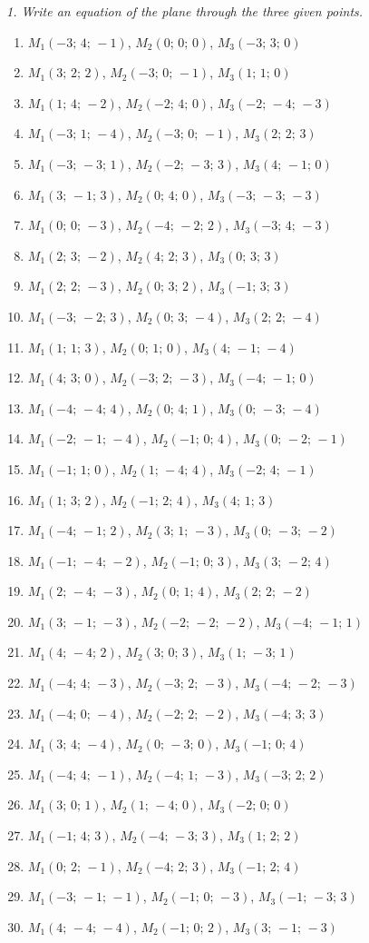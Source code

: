 \emph{1. Write an equation of the plane through the three given points.}
\bigskip
\begin{enumerate}[label=\arabic*., leftmargin=*]
\item $M_1(-3;\,4;\,-1)$, $M_2(0;\,0;\,0)$, $M_3(-3;\,3;\,0)$
\item $M_1(3;\,2;\,2)$, $M_2(-3;\,0;\,-1)$, $M_3(1;\,1;\,0)$
\item $M_1(1;\,4;\,-2)$, $M_2(-2;\,4;\,0)$, $M_3(-2;\,-4;\,-3)$
\item $M_1(-3;\,1;\,-4)$, $M_2(-3;\,0;\,-1)$, $M_3(2;\,2;\,3)$
\item $M_1(-3;\,-3;\,1)$, $M_2(-2;\,-3;\,3)$, $M_3(4;\,-1;\,0)$
\item $M_1(3;\,-1;\,3)$, $M_2(0;\,4;\,0)$, $M_3(-3;\,-3;\,-3)$
\item $M_1(0;\,0;\,-3)$, $M_2(-4;\,-2;\,2)$, $M_3(-3;\,4;\,-3)$
\item $M_1(2;\,3;\,-2)$, $M_2(4;\,2;\,3)$, $M_3(0;\,3;\,3)$
\item $M_1(2;\,2;\,-3)$, $M_2(0;\,3;\,2)$, $M_3(-1;\,3;\,3)$
\item $M_1(-3;\,-2;\,3)$, $M_2(0;\,3;\,-4)$, $M_3(2;\,2;\,-4)$
\item $M_1(1;\,1;\,3)$, $M_2(0;\,1;\,0)$, $M_3(4;\,-1;\,-4)$
\item $M_1(4;\,3;\,0)$, $M_2(-3;\,2;\,-3)$, $M_3(-4;\,-1;\,0)$
\item $M_1(-4;\,-4;\,4)$, $M_2(0;\,4;\,1)$, $M_3(0;\,-3;\,-4)$
\item $M_1(-2;\,-1;\,-4)$, $M_2(-1;\,0;\,4)$, $M_3(0;\,-2;\,-1)$
\item $M_1(-1;\,1;\,0)$, $M_2(1;\,-4;\,4)$, $M_3(-2;\,4;\,-1)$
\item $M_1(1;\,3;\,2)$, $M_2(-1;\,2;\,4)$, $M_3(4;\,1;\,3)$
\item $M_1(-4;\,-1;\,2)$, $M_2(3;\,1;\,-3)$, $M_3(0;\,-3;\,-2)$
\item $M_1(-1;\,-4;\,-2)$, $M_2(-1;\,0;\,3)$, $M_3(3;\,-2;\,4)$
\item $M_1(2;\,-4;\,-3)$, $M_2(0;\,1;\,4)$, $M_3(2;\,2;\,-2)$
\item $M_1(3;\,-1;\,-3)$, $M_2(-2;\,-2;\,-2)$, $M_3(-4;\,-1;\,1)$
\item $M_1(4;\,-4;\,2)$, $M_2(3;\,0;\,3)$, $M_3(1;\,-3;\,1)$
\item $M_1(-4;\,4;\,-3)$, $M_2(-3;\,2;\,-3)$, $M_3(-4;\,-2;\,-3)$
\item $M_1(-4;\,0;\,-4)$, $M_2(-2;\,2;\,-2)$, $M_3(-4;\,3;\,3)$
\item $M_1(3;\,4;\,-4)$, $M_2(0;\,-3;\,0)$, $M_3(-1;\,0;\,4)$
\item $M_1(-4;\,4;\,-1)$, $M_2(-4;\,1;\,-3)$, $M_3(-3;\,2;\,2)$
\item $M_1(3;\,0;\,1)$, $M_2(1;\,-4;\,0)$, $M_3(-2;\,0;\,0)$
\item $M_1(-1;\,4;\,3)$, $M_2(-4;\,-3;\,3)$, $M_3(1;\,2;\,2)$
\item $M_1(0;\,2;\,-1)$, $M_2(-4;\,2;\,3)$, $M_3(-1;\,2;\,4)$
\item $M_1(-3;\,-1;\,-1)$, $M_2(-1;\,0;\,-3)$, $M_3(-1;\,-3;\,3)$
\item $M_1(4;\,-4;\,-4)$, $M_2(-1;\,0;\,2)$, $M_3(3;\,-1;\,-3)$
\end{enumerate}

